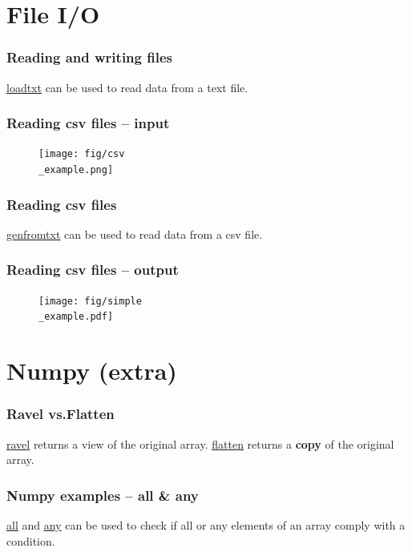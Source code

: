 \documentclass{beamer}
\newcommand{\hrefu}[2]{\underline{\href{#1}{#2}}}
\begin{document}
\section{File I/O}
\begin{frame}
  \frametitle{Reading and writing files}
  \hrefu{https://numpy.org/doc/stable/reference/generated/numpy.loadtxt.html}{loadtxt} can be used to read data from a text file.\\
  
\end{frame}
\begin{frame}
  \frametitle{Reading csv files -- input}
  \begin{figure}[H]
    \centering
    \begin{samepage}
        \texttt{[image: fig/csv\\\_example.png]}
    \end{samepage}
\end{figure}
\end{frame}
\begin{frame}
  \frametitle{Reading csv files}
  \hrefu{https://numpy.org/doc/stable/reference/generated/numpy.genfromtxt.html}{genfromtxt} can be used to read data from a csv file.\\
  
\end{frame}
\begin{frame}
  \frametitle{Reading csv files -- output}
  \begin{figure}[H]
    \centering
    \begin{samepage}
        \texttt{[image: fig/simple\\\_example.pdf]}
    \end{samepage}
\end{figure}
\end{frame}
\section{Numpy (extra)}
\begin{frame}
  \frametitle{Ravel vs.Flatten}
  \hrefu{https://numpy.org/doc/stable/reference/generated/numpy.ravel.html}{ravel} returns a view of the original array. \hrefu{https://numpy.org/doc/stable/reference/generated/numpy.ndarray.flatten.html}{flatten} returns a \textbf{copy} of the original array.
  
\end{frame}
\begin{frame}
  \frametitle{Numpy examples -- all \& any}
  \hrefu{https://numpy.org/doc/stable/reference/generated/numpy.all.html}{all} and \hrefu{https://numpy.org/doc/stable/reference/generated/numpy.any.html}{any} can be used to check if all or any elements of an array comply with a condition.
  
\end{frame}
\end{document}
